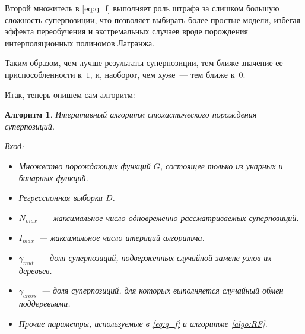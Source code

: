 \documentclass[12pt,a4paper]{article}
\newtheorem{algo}{Алгоритм}
\begin{document}
Второй множитель в \eqref{eq:q_f} выполняет роль штрафа за слишком
большую сложность суперпозиции, что позволяет выбирать более простые модели,
избегая эффекта переобучения и экстремальных случаев вроде порождения
интерполяционных полиномов Лагранжа.

Таким образом, чем лучше результаты суперпозиции, тем ближе значение ее
приспособленности к~$1$, и, наоборот, чем хуже~--- тем ближе к~$0$.

Итак, теперь опишем сам алгоритм:
\begin{algo}
  \label{algo:SA}
  Итеративный алгоритм стохастического порождения суперпозиций.

  Вход:
  \begin{itemize}
	\item Множество порождающих функций $G$, состоящее только из унарных
	  и бинарных функций.
	\item Регрессионная выборка $D$.
	\item $N_{max}$~--- максимальное число одновременно рассматриваемых
	  суперпозиций.
	\item $I_{max}$~--- максимальное число итераций алгоритма.
	\item $\gamma_{mut}$~--- доля суперпозиций, подверженных случайной
	  замене узлов их деревьев.
	\item $\gamma_{cross}$~--- доля суперпозиций, для которых выполняется
	  случайный обмен поддеревьями.
	\item Прочие параметры, используемые в \eqref{eq:q_f} и алгоритме
	  \ref{algo:RF}.
  \end{itemize}
\end{algo}
\end{document}

